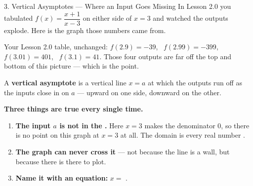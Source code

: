 \documentclass[10pt]{article}
\begin{document}
\vspace{0.10in}

\boxguard[30]
\begin{notesbox}{3. Vertical Asymptotes --- Where an Input Goes Missing}
\small
In Lesson 2.0 you tabulated $f(x)=\dfrac{x+1}{x-3}$ on either side of $x=3$ and watched the outputs
explode. Here is the graph those numbers came from.

\begin{center}
\end{center}

\vspace{-4pt}
{\scriptsize Your Lesson 2.0 table, unchanged: $f(2.9)=-39$, \ $f(2.99)=-399$, \ $f(3.01)=401$, \
$f(3.1)=41$. Those four outputs are far off the top and bottom of this picture --- which is the point.}

\vspace{4pt}
A \textbf{vertical asymptote} is a vertical line $x=a$ at which the outputs run off
\ans{without bound} as the inputs close in on $a$ --- upward on one side, downward on the other.

\vspace{4pt}
\textbf{Three things are true every single time.}
\begin{enumerate}[leftmargin=1.5em, itemsep=3pt, topsep=3pt]
  \item \textbf{The input $a$ is not in the .} Here $x=3$ makes the denominator $0$, so
        there is no point on this graph at $x=3$ at all. The domain is every real number
        \ans{except $3$}.
  \item \textbf{The graph can never cross it} --- not because the line is a wall, but because there
        is \ans{no point} there to plot.
  \item \textbf{Name it with an equation:} $x=$ .
\end{enumerate}


\end{notesbox}
\end{document}
